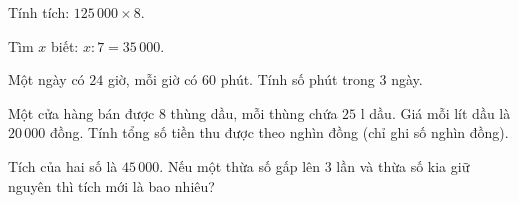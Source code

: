 \begin{ex} %
Tính tích: $125\,000 \times 8$.
\end{ex}

\begin{ex} %
Tìm $x$ biết: $x : 7 = 35\,000$.
\end{ex}

\begin{ex} %
Một ngày có $24$ giờ, mỗi giờ có $60$ phút. Tính số phút trong 3 ngày.
\end{ex}

\begin{ex} %
Một cửa hàng bán được 8 thùng dầu, mỗi thùng chứa $25\text{ l}$ dầu. Giá mỗi lít dầu là $20\,000$ đồng. Tính tổng số tiền thu được theo nghìn đồng (chỉ ghi số nghìn đồng).
\end{ex}

\begin{ex} %
Tích của hai số là $45\,000$. Nếu một thừa số gấp lên 3 lần và thừa số kia giữ nguyên thì tích mới là bao nhiêu?
\end{ex}
